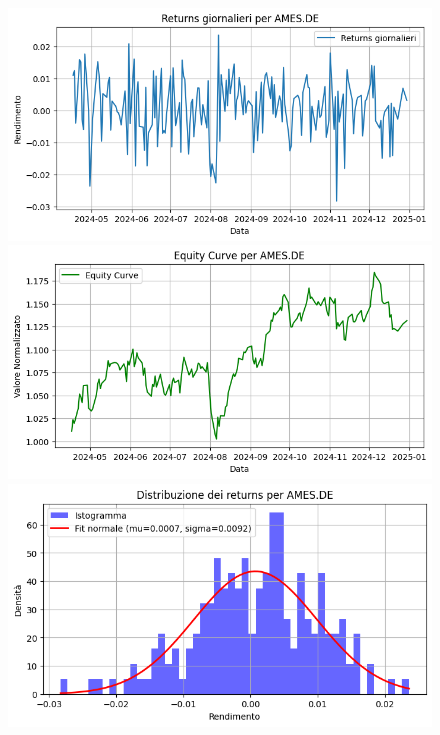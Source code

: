 \documentclass{article}%
\begin{document}
\begin{figure}[htbp]%
\begin{minipage}{0.31\textwidth}%
\includegraphics[width=\linewidth]{immagini_tickers/AMES.DE_returns_plot.png}%
\end{minipage}%
\begin{minipage}{0.31\textwidth}%
\includegraphics[width=\linewidth]{immagini_tickers/AMES.DE_equity_curve.png}%
\end{minipage}%
\begin{minipage}{0.31\textwidth}%
\includegraphics[width=\linewidth]{immagini_tickers/AMES.DE_distribuzione_returns.png}%
\end{minipage}%
\end{figure}
\end{document}
